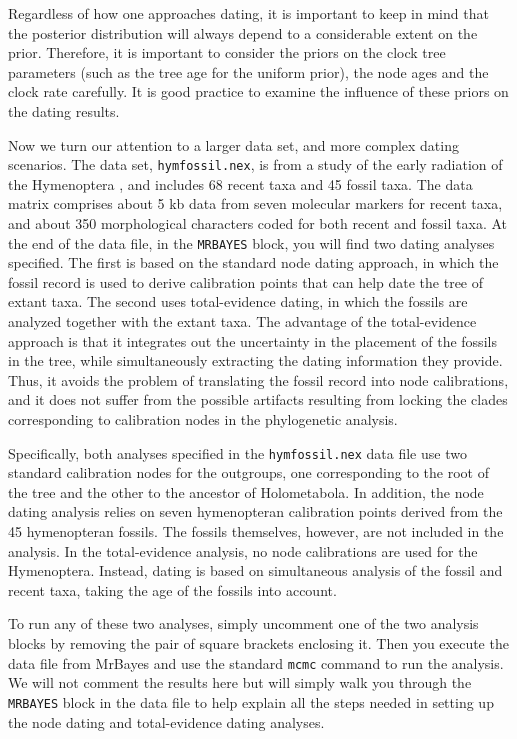 \documentclass[12pt]{book}
\newcommand{\ttt}[1]{\texttt{#1}}
\begin{document}
Regardless of how one approaches dating, it is important to keep in mind that the posterior
distribution will always depend to a considerable extent on the prior. Therefore, it is important
to consider the priors on the clock tree parameters (such as the tree age for the uniform prior),
the node ages and the clock rate carefully. It is good practice to examine the influence of these
priors on the dating results.

Now we turn our attention to a larger data set, and more complex dating scenarios. The data set,
\ttt{hymfossil.nex}, is from a study of the early radiation of the Hymenoptera \citep{ronquist12b},
and includes 68 recent taxa and 45 fossil taxa. The data matrix comprises about 5 kb data from
seven molecular markers for recent taxa, and about 350 morphological characters coded for both
recent and fossil taxa.
At the end of the data file, in the \ttt{MRBAYES} block, you will find two dating analyses
specified. The first is based on the standard node dating approach, in which the fossil record is
used to derive calibration points that can help date the tree of extant taxa. The second uses
total-evidence dating, in which the fossils are analyzed together with the extant taxa. The
advantage of the total-evidence approach is that it integrates out the uncertainty in the placement
of the fossils in the tree, while simultaneously extracting the dating information they provide.
Thus, it avoids the problem of translating the fossil record into node calibrations, and it does
not suffer from the possible artifacts resulting from locking the clades corresponding to
calibration nodes in the phylogenetic analysis.

Specifically, both analyses specified in the \ttt{hymfossil.nex} data file use two standard
calibration nodes for the outgroups, one corresponding to the root of the tree and the other to the
ancestor of Holometabola. In addition, the node dating analysis relies on seven hymenopteran
calibration points derived from the 45 hymenopteran fossils. The fossils themselves, however, are
not included in the analysis. In the total-evidence analysis, no node calibrations are used for the
Hymenoptera. Instead, dating is based on simultaneous analysis of the fossil and recent taxa,
taking the age of the fossils into account.

To run any of these two analyses, simply uncomment one of the two analysis blocks by removing the
pair of square brackets enclosing it. Then you execute the data file from MrBayes and use the
standard \ttt{mcmc} command to run the analysis. We will not comment the results here but will
simply walk you through the \ttt{MRBAYES} block in the data file to help explain all the steps
needed in setting up the node dating and total-evidence dating analyses.
\end{document}
